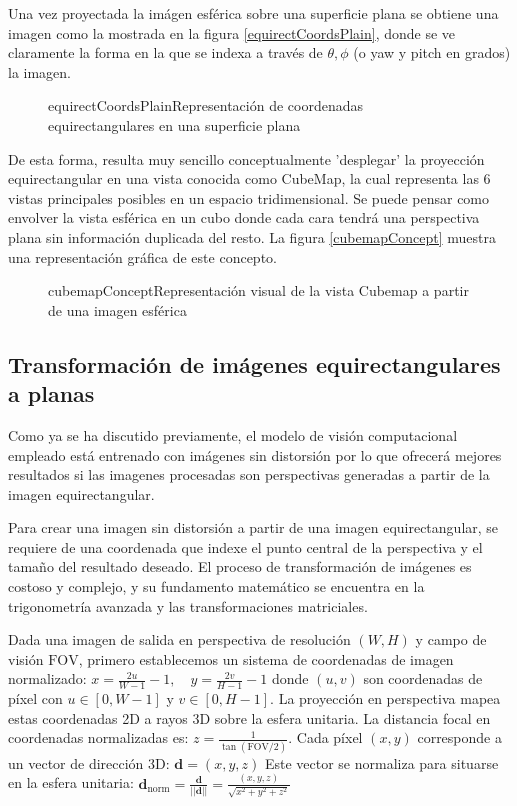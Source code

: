Una vez proyectada la imágen esférica sobre una superficie plana se obtiene una imagen como la mostrada en la figura \ref{equirectCoordsPlain}, donde se ve claramente la forma en la que se indexa a través de $\theta, \phi$ (o yaw y pitch en grados) la imagen.


\begin{figure}[Representación de coordenadas equirectangulares]{equirectCoordsPlain}{Representación de coordenadas equirectangulares en una superficie plana}
	\begin{center}
	\end{center}
\end{figure}

De esta forma, resulta muy sencillo conceptualmente 'desplegar' la proyección equirectangular en una vista conocida como CubeMap, la cual representa las 6 vistas principales posibles en un espacio tridimensional. Se puede pensar como envolver la vista esférica en un cubo donde cada cara tendrá una perspectiva plana sin información duplicada del resto. La figura \ref{cubemapConcept} muestra una representación gráfica de este concepto.

\begin{figure}[Representación visual de cubemap]{cubemapConcept}{Representación visual de la vista Cubemap a partir de una imagen esférica}
	\begin{center}
	\end{center}
\end{figure}

\subsection{Transformación de imágenes equirectangulares a planas}
Como ya se ha discutido previamente, el modelo de visión computacional empleado está entrenado con imágenes sin distorsión por lo que ofrecerá mejores resultados si las imagenes procesadas son perspectivas generadas a partir de la imagen equirectangular.

Para crear una imagen sin distorsión a partir de una imagen equirectangular, se requiere de una coordenada que indexe el punto central de la perspectiva y el tamaño del resultado deseado. 
El proceso de transformación de imágenes es costoso y complejo, y su fundamento matemático se encuentra en la trigonometría avanzada y las transformaciones matriciales.

Dada una imagen de salida en perspectiva de resolución $(W, H)$ y campo de visión $\text{FOV}$, primero establecemos un sistema de coordenadas de imagen normalizado:
$x = \frac{2u}{W-1} - 1, \quad y = \frac{2v}{H-1} - 1$
donde $(u, v)$ son coordenadas de píxel con $u \in [0, W-1]$ y $v \in [0, H-1]$.
La proyección en perspectiva mapea estas coordenadas 2D a rayos 3D sobre la esfera unitaria. La distancia focal en coordenadas normalizadas es:
$z = \frac{1}{\tan(\text{FOV}/2)}$.
Cada píxel $(x, y)$ corresponde a un vector de dirección 3D:
$\mathbf{d} = (x, y, z)$
Este vector se normaliza para situarse en la esfera unitaria:
$\mathbf{d}_{\text{norm}} = \frac{\mathbf{d}}{||\mathbf{d}||} = \frac{(x, y, z)}{\sqrt{x^2 + y^2 + z^2}}$

